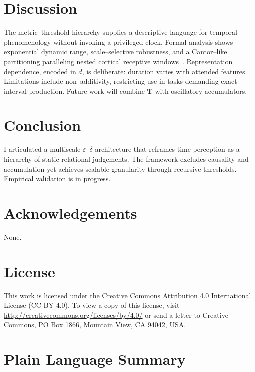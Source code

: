 \documentclass[preprint,11pt]{elsarticle}
\begin{document}
\section{Discussion}
The metric--threshold hierarchy supplies a descriptive language for
temporal phenomenology without invoking a privileged clock.  Formal
analysis shows exponential dynamic range, scale--selective robustness,
and a Cantor--like partitioning paralleling nested cortical receptive
windows~\citep{hasson2008hierarchical}.  Representation dependence,
encoded in $d$, is deliberate: duration varies with attended features.
Limitations include non--additivity, restricting use in tasks demanding
exact interval production.  Future work will combine $\mathbf T$ with
oscillatory accumulators.

\section{Conclusion}
I articulated a multiscale $\varepsilon$--$\delta$ architecture that
reframes time perception as a hierarchy of static relational
judgements.  The framework excludes causality and accumulation yet
achieves scalable granularity through recursive thresholds.
Empirical validation is in progress.

\section*{Acknowledgements}
None.

\section*{License}
This work is licensed under the Creative Commons Attribution 4.0 International License (CC-BY-4.0). To view a copy of this license, visit \url{http://creativecommons.org/licenses/by/4.0/} or send a letter to Creative Commons, PO Box 1866, Mountain View, CA 94042, USA.

\appendix

\section{Plain Language Summary}
\label{app:plain_summary}
\end{document}
